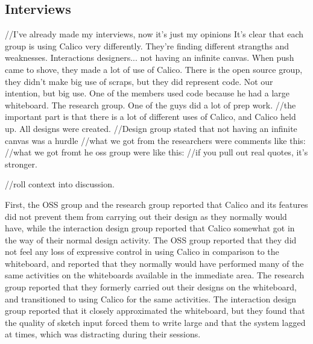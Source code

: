 \subsection{Interviews}
//I've already made my interviews, now it's just my opinions
It's clear that each group is using Calico very differently. They're finding different strangths and weaknesses. Interactions designers... not having an infinite canvas. When push came to shove, they made a lot of use of Calico. 
There is the open source group, they didn't make big use of scraps, but they did represent code. Not our intention, but big use. One of the members used code because he had a large whiteboard.
The research group. One of the guys did a lot of prep work.
//the important part is that there is a lot of different uses of Calico, and Calico held up. All designs were created. 
//Design group stated that not having an infinite canvas was a hurdle
//what we got from the researchers were comments like this:
//what we got fromt he oss group were like this:
//if you pull out real quotes, it's stronger.

//roll context into discussion. 


First, the OSS group and the research group reported that Calico and its features did not prevent them from carrying out their design as they normally would have, while the interaction design group reported that Calico somewhat got in the way of their normal design activity. The OSS group reported that they did not feel any loss of expressive control in using Calico in comparison to the whiteboard, and reported that they normally would have performed many of the same activities on the whiteboards available in the immediate area. The research group reported that they formerly carried out their designs on the whiteboard, and transitioned to using Calico for the same activities. The interaction design group reported that it closely approximated the whiteboard, but they found that the quality of sketch input forced them to write large and that the system lagged at times, which was distracting during their sessions.


